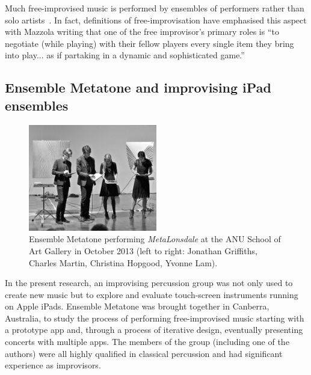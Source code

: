 \documentclass[graybox]{svmult}
\begin{document}
Much free-improvised music is performed by ensembles of performers
rather than solo artists~\cite{Stenstrom:2009xy}. In fact, definitions
of free-improvisation have emphasised this aspect with Mazzola writing
that one of the free improvisor's primary roles is ``to negotiate
(while playing) with their fellow players every single item they bring
into play... as if partaking in a dynamic and sophisticated
game.''~\cite{Mazzola:2009cr} 

\subsection{Ensemble Metatone and improvising iPad ensembles}


\begin{figure}
  \centering
  \includegraphics[width=0.5\textwidth]{figures/ensemblemetatone-bw}
  \caption{Ensemble Metatone performing \emph{MetaLonsdale} at the ANU
    School of Art Gallery in October 2013 (left to right: Jonathan
    Griffiths, Charles Martin, Christina Hopgood, Yvonne Lam).}
  \label{ensemblemetatoneperforming}
\end{figure}



In the present research, an improvising percussion group was not only
used to create new music but to explore and evaluate touch-screen
instruments running on Apple iPads. Ensemble Metatone was brought
together in Canberra, Australia, to study the process of performing
free-improvised music starting with a prototype app and, through a
process of iterative design, eventually presenting concerts with
multiple apps. The members of the group (including one of the authors)
were all highly qualified in classical percussion and had significant
experience as improvisors.
\end{document}

